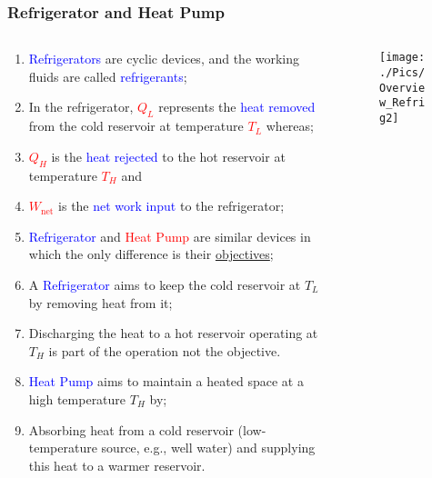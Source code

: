 \documentclass[10pt,compress,handout,unknownkeysallowed]{beamer}
\begin{document}
\begin{frame}
 \frametitle{Refrigerator and Heat Pump}
  \begin{columns}
   \begin{column}[c]{0.45\linewidth}
    \begin{enumerate}[(1)]\scriptsize
     \item <1-> \textcolor{blue}{Refrigerators} are cyclic devices, and the working fluids are called \textcolor{blue}{refrigerants};
     \item <1-> In the refrigerator, \textcolor{red}{$Q_{L}$} represents the \textcolor{blue}{heat removed} from the cold reservoir at temperature \textcolor{red}{$T_{L}$} whereas;
     \item <1-> \textcolor{red}{$Q_{H}$} is the \textcolor{blue}{heat rejected} to the hot reservoir at temperature \textcolor{red}{$T_{H}$} and 
     \item <1-> \textcolor{red}{$W_{\text{net}}$} is the \textcolor{blue}{net work input} to the refrigerator;
     \item <1-> \textcolor{blue}{Refrigerator} and \textcolor{red}{Heat Pump} are similar devices in which the only difference is their \underline{objectives};
     \item <2-> A \textcolor{blue}{Refrigerator} aims to keep the cold reservoir at $T_{L}$ by removing heat from it;
     \item <2-> Discharging the heat to a hot reservoir operating at $T_{H}$ is part of the operation not the objective.
     \item <3-> \textcolor{blue}{Heat Pump} aims to maintain a heated space at a high temperature $T_{H}$ by;
     \item <3-> Absorbing heat from a cold reservoir (low-temperature source, e.g., well water) and supplying this heat to a warmer reservoir.
    \end{enumerate}
   \end{column}
   \begin{column}[c]{0.55\linewidth}
    \begin{figure}%
     \begin{center}
      \texttt{[image: ./Pics/Overview\_Refrig2]}
     \end{center}
    \end{figure}
   \end{column}  
  \end{columns}
\end{frame}
\end{document}
